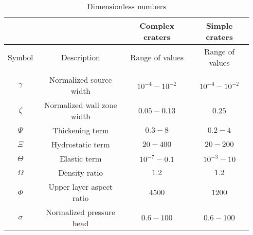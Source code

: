 \begin{table}
  \caption{Dimensionless numbers}
  \centering
  \begin{tabular}{c|c|c|c}
    &&Complex craters&Simple craters \\
    \hline
    Symbol& Description & Range of values & Range of values \\
    \hline
    &&\\
    $\gamma$&Normalized source width& $10^{-4}-10^{-2}$ &$10^{-4}-10^{-2}$ \\
    $\zeta$& Normalized wall zone width  & $0.05-0.13$&$0.25$\\
    $\Psi$&Thickening term & $0.3-8$&$0.2-4$\\
    $\Xi$& Hydrostatic term & $20-400$&$20-200$\\
    $\Theta$ &Elastic term & $10^{-7}-0.1$&$10^{-3}-10$\\
    $\Omega$ & Density ratio & $1.2$ &$1.2$\\
    $\Phi$ & Upper layer aspect ratio & $4500$ &$1200 $\\
    $\sigma$&Normalized pressure head& $0.6-100$ & $0.6-100$ 
                                                   \label{tab3}
  \end{tabular} 
\end{table}
